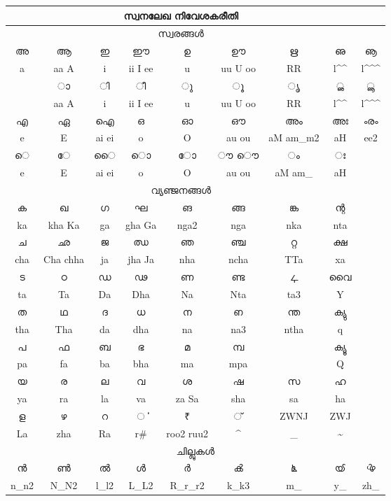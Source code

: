 \documentclass[a4paper]{article}
\makeatletter
\def\en{\color{black!80}\normalsize\En}
\def\mhat{\expandafter\@gobble\string\^}
\def\at{\expandafter\@gobble\string\@}
\def\tldchr{\expandafter\@gobble\string\~}
\def\undchr{\expandafter\@gobble\string\_}
\makeatother
\begin{document}
\Large

\centering

\begin{tabular}{|c|c|c|c|c|c|c|c|c|}
\multicolumn{8}{c}{സ്വനലേഖ നിവേശകരീതി}\\
\hline
\multicolumn{8}{c}{സ്വരങ്ങള്‍}\\
\hline
അ & ആ & ഇ & ഈ & ഉ & ഊ & ഋ & ഌ & ൡ \\
\en a &\en aa A &\en i &\en ii I ee &\en u &\en uu U oo 
        &\en RR & \en l\mhat\mhat & \en l\mhat\mhat\mhat \\
\hline
    & ാ & ി & ീ & ു & ൂ & ൃ & ൢ & ൣ \\
\en  &\en \at aa \at A &\en \at i &\en \at ii \at \at I \at ee &\en \at u &\en \at \at uu \at U \at oo 
        &\en \at RR & \en \at l\mhat\mhat &\en  \at l\mhat\mhat\mhat \\
\hline 
എ & ഏ & ഐ & ഒ & ഓ & ഔ & അം & അഃ & ൟ \\
\en e &\en E &\en ai ei &\en o &\en O &\en au ou &\en aM am\undchr\space m2 &\en aH & \en ee2 \\
\hline
െ & േ & ൈ &ൊ & ോ & ൗ ൌ &ം&  ഃ & \\
\en \at e &\en \at E &\en \at ai \at ei &\en \at o &\en \at O &\en  \at au  \at ou &\en \at aM am\undchr\space & \en \at aH  & \\
\hline
\multicolumn{8}{c}{വ്യഞ്ജനങ്ങള്‍}\\
\hline
ക & ഖ & ഗ & ഘ & ങ  & ങ്ങ & ങ്ക & ന്റ &\\
\en ka &\en kha Ka &\en ga &\en gha Ga& \en nga2 & \en nga &
 \en nka & \en nta &\\
\hline 
ച & ഛ & ജ & ഝ & ഞ & ഞ്ച & റ്റ  & ക്ഷ & \\
\en cha & \en Cha chha &\en ja &\en jha Ja &\en nha &\en ncha & \en TTa &\en xa &\\
\hline
ട & ഠ & ഡ & ഢ & ണ & ണ്ട & ഺ & വൈ &\\
\en ta & \en Ta &\en Da &\en Dha &\en Na & \en Nta & \en ta3 &\en Y &\\
\hline
ത & ഥ & ദ & ധ & ന & ഩ & ന്ത & ക്യു &\\
\en tha &\en Tha &\en da &\en dha & \en na & \en na3 & \en ntha & \en q &\\
\hline 
പ & ഫ & ബ & ഭ & മ & മ്പ &  & ക്യൂ  &\\
\en pa&\en fa &\en ba&\en bha & \en ma &\en mpa& & \en Q &\\
\hline
യ & ര & ല & വ & ശ & ഷ & സ & ഹ &\\
\en ya&\en ra&\en la &\en va&\en za Sa&\en sha &\en sa & \en ha &\\
\hline
ള & ഴ & റ & ൎ & ₹ & ്  &\en ZWNJ & \en ZWJ &\\
\en La &\en zha &\en Ra &\en r\# & \en roo2 ruu2 & \mhat & \undchr & \tldchr &\\
\hline
\multicolumn{9}{c}{ചില്ലുകള്‍}\\
\hline
ന്‍ & ണ്‍ & ല്‍ & ള്‍ & ര്‍ & ൿ & ൔ & ൕ & ൖ \\
\en n\undchr \space n2 &\en N\undchr \space N2 &\en l\undchr \space l2 &\en L\undchr \space L2 &\en R\undchr \space r\undchr \space r2
&\en k\undchr \space k3 & \en m\undchr & \en y\undchr & \en zh\undchr \\
\hline
\end{tabular} 
\end{document}
